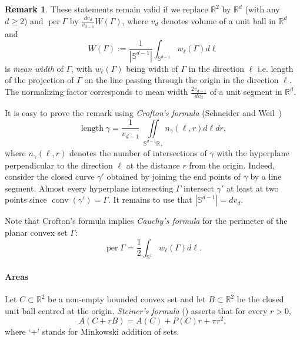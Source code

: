 \documentclass[10pt]{amsart}
\theoremstyle{definition}\newtheorem{defi}[theo]{Definition}\newtheorem{rema}[theo]{Remark}\newtheorem{exam}[theo]{Example}\newtheorem{exem}[theo]{Example}\newtheorem{nota}[theo]{Notation}
\DeclareMathOperator{\per}{per}
\DeclareMathOperator{\length}{length}
\DeclareMathOperator{\conv}{conv}
\newcommand{\Rbb}{\mathbb{R}}
\newcommand{\Sbb}{\mathbb{S}}
\begin{document}
\begin{rema}\label{rem: mean width}
These statements remain valid if we replace $\Rbb^2$ by $\Rbb^d$ (with any $d \ge 2$) and $\per \Gamma$ by $\tfrac{d v_d}{v_{d-1}} W(\Gamma)$, where $v_d$ denotes volume of a unit ball in $\Rbb^d$ and
\begin{equation}\label{eq: mean width}
W(\Gamma):= \frac{1}{|\Sbb^{d-1}|} \int_{\Sbb^{d-1}} w_\ell(\Gamma) d \ell
\end{equation}
is \emph{mean width} of $\Gamma$, with $w_\ell (\Gamma)$ being width of $\Gamma$ in the direction $\ell$ i.e. length of the projection of $\Gamma$ on the line passing through the origin in the direction $\ell$. The normalizing factor corresponds to mean width $\tfrac{2 v_{d-1}}{d v_d}$ of a unit segment in $\Rbb^d$.
\end{rema}

It is easy to prove the remark using {\it Crofton's formula} (Schneider and Weil~\cite[Eq.~(5.32)]{SchneiderWeil})
\[
\length \gamma = \frac{1}{v_{d-1}}\;\iint \limits_{\Sbb^{d-1} \Rbb_+}n_{\gamma}(\ell, r) d\ell dr,
\]
where $n_\gamma(\ell, r)$ denotes the number of intersections of $\gamma$ with the hyperplane perpendicular to the direction $\ell$ at the distance $r$ from the origin. Indeed, consider the closed curve $\gamma'$ obtained by joining the end points of $\gamma$ by a line segment. Almost every hyperplane intersecting $\Gamma$ intersect $\gamma'$ at least at two points since $\conv(\gamma')=\Gamma$. It remains to use that $|\Sbb^{d-1}| = d v_d$.

Note that Crofton's formula implies \emph{Cauchy's formula} for the perimeter of the planar convex set $\Gamma$:
\begin{equation}\label{eq: Cauchy}
\per \Gamma = \frac12 \int_{\Sbb^1} w_\ell(\Gamma) d\ell.
\end{equation}

\paragraph{Areas}
Let $C \subset \Rbb^2$ be a non-empty bounded convex set and let $B \subset \Rbb^2$ be the closed unit ball centred at the origin. \emph{Steiner's formula} (\cite[Eq.~(14.5)]{SchneiderWeil}) asserts that for every $r>0$,
\begin{equation}\label{eq: Steiner}
A(C+r B) = A(C) + P(C) r + \pi r^2,
\end{equation}
where `$+$' stands for Minkowski addition of sets.
\end{document}
